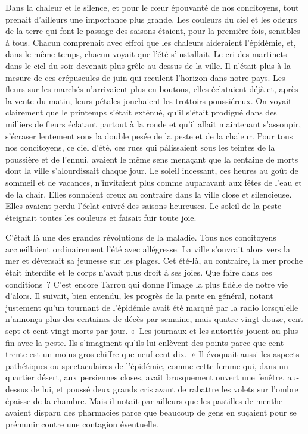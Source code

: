 \documentclass[french,twoside]{book} %
\begin{document}
Dans la chaleur et le silence, et pour le cœur épouvanté de nos concitoyens, tout prenait d’ailleurs une importance plus grande. Les couleurs du ciel et les odeurs de la terre qui font le passage des saisons étaient, pour la première fois, sensibles à tous. Chacun comprenait avec effroi que les chaleurs aideraient l’épidémie, et, dans le même temps, chacun voyait que l’été s’installait. Le cri des martinets dans le ciel du soir devenait plus grêle au-dessus de la ville. Il n’était plus à la mesure de ces crépuscules de juin qui reculent l’horizon dans notre pays. Les fleurs sur les marchés n’arrivaient plus en boutons, elles éclataient déjà et, après la vente du matin, leurs pétales jonchaient les trottoirs poussiéreux. On voyait clairement que le printemps s’était exténué, qu’il s’était prodigué dans des milliers de fleurs éclatant partout à la ronde et qu’il allait maintenant s’assoupir, s’écraser lentement sous la double pesée de la peste et de la chaleur. Pour tous nos concitoyens, ce ciel d’été, ces rues qui pâlissaient sous les teintes de la poussière et de l’ennui, avaient le même sens menaçant que la centaine de morts dont la ville s’alourdissait chaque jour. Le soleil incessant, ces heures au goût de sommeil et de vacances, n’invitaient plus comme auparavant aux fêtes de l’eau et de la chair. Elles sonnaient creux au contraire dans la ville close et silencieuse. Elles avaient perdu l’éclat cuivré des saisons heureuses. Le soleil de la peste éteignait toutes les couleurs et faisait fuir toute joie.\par
C’était là une des grandes révolutions de la maladie. Tous nos concitoyens accueillaient ordinairement l’été avec allégresse. La ville s’ouvrait alors vers la mer et déversait sa jeunesse sur les plages. Cet été-là, au contraire, la mer proche était interdite et le corps n’avait plus droit à ses joies. Que faire dans ces conditions ? C’est encore Tarrou qui donne l’image la plus fidèle de notre vie d’alors. Il suivait, bien entendu, les progrès de la peste en général, notant justement qu’un tournant de l’épidémie avait été marqué par la radio lorsqu’elle n’annonça plus des centaines de décès par semaine, mais quatre-vingt-douze, cent sept et cent vingt morts par jour. « Les journaux et les autorités jouent au plus fin avec la peste. Ils s’imaginent qu’ils lui enlèvent des points parce que cent trente est un moins gros chiffre que neuf cent dix. » Il évoquait aussi les aspects pathétiques ou spectaculaires de l’épidémie, comme cette femme qui, dans un quartier désert, aux persiennes closes, avait brusquement ouvert une fenêtre, au-dessus de lui, et poussé deux grands cris avant de rabattre les volets sur l’ombre épaisse de la chambre. Mais il notait par ailleurs que les pastilles de menthe avaient disparu des pharmacies parce que beaucoup de gens en suçaient pour se prémunir contre une contagion éventuelle.\par
\end{document}

